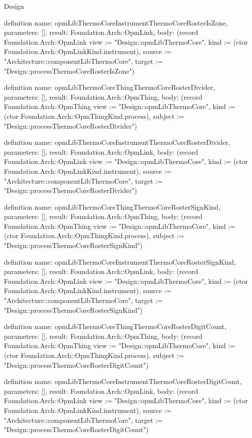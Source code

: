 \begin{lexlean}{Design}
\begin{semanticmodule}
definition{
  name: opmLibThermoCoreInstrumentThermoCoreRosterIsZone,
  parameters: [],
  result: Foundation.Arch::OpmLink,
  body: (record Foundation.Arch::OpmLink {view := "Design::opmLibThermoCore", kind := (ctor Foundation.Arch::OpmLinkKind.instrument), source := "Architecture::componentLibThermoCore", target := "Design::processThermoCoreRosterIsZone"})
}

definition{
  name: opmLibThermoCoreThingThermoCoreRosterDivider,
  parameters: [],
  result: Foundation.Arch::OpmThing,
  body: (record Foundation.Arch::OpmThing {view := "Design::opmLibThermoCore", kind := (ctor Foundation.Arch::OpmThingKind.process), subject := "Design::processThermoCoreRosterDivider"})
}

definition{
  name: opmLibThermoCoreInstrumentThermoCoreRosterDivider,
  parameters: [],
  result: Foundation.Arch::OpmLink,
  body: (record Foundation.Arch::OpmLink {view := "Design::opmLibThermoCore", kind := (ctor Foundation.Arch::OpmLinkKind.instrument), source := "Architecture::componentLibThermoCore", target := "Design::processThermoCoreRosterDivider"})
}

definition{
  name: opmLibThermoCoreThingThermoCoreRosterSignKind,
  parameters: [],
  result: Foundation.Arch::OpmThing,
  body: (record Foundation.Arch::OpmThing {view := "Design::opmLibThermoCore", kind := (ctor Foundation.Arch::OpmThingKind.process), subject := "Design::processThermoCoreRosterSignKind"})
}

definition{
  name: opmLibThermoCoreInstrumentThermoCoreRosterSignKind,
  parameters: [],
  result: Foundation.Arch::OpmLink,
  body: (record Foundation.Arch::OpmLink {view := "Design::opmLibThermoCore", kind := (ctor Foundation.Arch::OpmLinkKind.instrument), source := "Architecture::componentLibThermoCore", target := "Design::processThermoCoreRosterSignKind"})
}

definition{
  name: opmLibThermoCoreThingThermoCoreRosterDigitCount,
  parameters: [],
  result: Foundation.Arch::OpmThing,
  body: (record Foundation.Arch::OpmThing {view := "Design::opmLibThermoCore", kind := (ctor Foundation.Arch::OpmThingKind.process), subject := "Design::processThermoCoreRosterDigitCount"})
}

definition{
  name: opmLibThermoCoreInstrumentThermoCoreRosterDigitCount,
  parameters: [],
  result: Foundation.Arch::OpmLink,
  body: (record Foundation.Arch::OpmLink {view := "Design::opmLibThermoCore", kind := (ctor Foundation.Arch::OpmLinkKind.instrument), source := "Architecture::componentLibThermoCore", target := "Design::processThermoCoreRosterDigitCount"})
}


\end{semanticmodule}
\end{lexlean}
